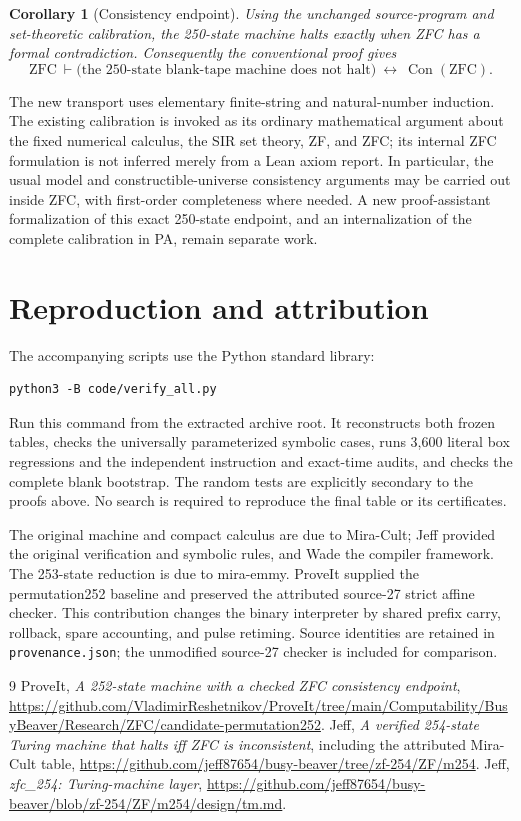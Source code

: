 \documentclass[11pt]{article}
\newtheorem{corollary}{Corollary}
\newcommand{\Con}{\operatorname{Con}}
\begin{document}
\begin{corollary}[Consistency endpoint]
Using the unchanged source-program and set-theoretic calibration, the
250-state machine halts exactly when ZFC has a formal contradiction.
Consequently the conventional proof gives
\[
 \mathrm{ZFC}\ \vdash
 \bigl(\text{the 250-state blank-tape machine does not halt}\bigr)
 \ \longleftrightarrow\ \Con(\mathrm{ZFC}).
\]
\end{corollary}

The new transport uses elementary finite-string and natural-number
induction.  The existing calibration is invoked as its ordinary
mathematical argument about the fixed numerical calculus, the SIR
set theory, ZF, and ZFC; its internal ZFC formulation is not inferred
merely from a Lean axiom report.  In particular, the usual model and
constructible-universe consistency arguments may be carried out inside
ZFC, with first-order completeness where needed.  A new proof-assistant
formalization of this exact 250-state endpoint, and an internalization
of the complete calibration in PA, remain separate work.

\section{Reproduction and attribution}

The accompanying scripts use the Python standard library:
\begin{verbatim}
python3 -B code/verify_all.py
\end{verbatim}
Run this command from the extracted archive root. It reconstructs both
frozen tables, checks the universally parameterized symbolic cases, runs
3,600 literal box regressions and the independent instruction and exact-time
audits, and checks the complete blank bootstrap.  The random
tests are explicitly secondary to the proofs above.  No search is
required to reproduce the final table or its certificates.

The original machine and compact calculus are due to Mira-Cult; Jeff
provided the original verification and symbolic rules, and Wade the
compiler framework.  The 253-state reduction is due to mira-emmy.
ProveIt supplied the permutation252 baseline and preserved the
attributed source-27 strict affine checker.  This contribution changes
the binary interpreter by shared prefix carry, rollback, spare
accounting, and pulse retiming.  Source identities are retained in
\texttt{provenance.json}; the unmodified source-27 checker is included
for comparison.

\begingroup\small\raggedright
\begin{thebibliography}{9}
ProveIt, \emph{A 252-state machine with a checked ZFC consistency endpoint},
\url{https://github.com/VladimirReshetnikov/ProveIt/tree/main/Computability/BusyBeaver/Research/ZFC/candidate-permutation252}.
Jeff, \emph{A verified 254-state Turing machine that halts iff ZFC is inconsistent},
including the attributed Mira-Cult table,
\url{https://github.com/jeff87654/busy-beaver/tree/zf-254/ZF/m254}.
Jeff, \emph{zfc\_254: Turing-machine layer},
\url{https://github.com/jeff87654/busy-beaver/blob/zf-254/ZF/m254/design/tm.md}.
\end{thebibliography}
\endgroup
\end{document}
